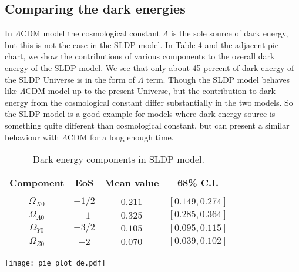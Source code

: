 \documentclass[11pt,a4paper]{article}
\begin{document}
\pagebreak
$\;$
\pagebreak
\subsection{Comparing the dark energies}
In $\Lambda$CDM model the cosmological constant $\Lambda$ is the sole source of dark energy, but this is not the case in the SLDP model. In Table 4 and the adjacent pie chart, we show the contributions of various components to the overall dark energy of the SLDP model. We see that only about 45 percent of dark energy of the SLDP Universe is in the form of $\Lambda$ term. Though the SLDP model behaves like $\Lambda$CDM model up to the present Universe, but the contribution to dark energy from the cosmological constant  differ substantially in the two models. So the SLDP model is a good example for models where dark energy source is something quite different than cosmological constant, but can present a similar behaviour with $\Lambda$CDM for a long enough time.

\begin{table}[h]
\caption{\footnotesize{Dark energy components in SLDP model.}} 
\centering
\parbox{0.4\textwidth}{
\begin{footnotesize}
\begin{tabular}{cccc}
\hline\hline Component&EoS &Mean value&68\% C.I.\\ \hline \\
$\Omega_{X0}$&$-1/2$	& $ 0.211$& $[0.149,0.274]$\\[8pt]
$\Omega_{\Lambda 0}$&$-1$&  $0.325$&$[0.285,0. 364]$ \\[8pt]
$\Omega_{Y0}$&$-3/2$&$0.105$ &$[0.095,0.115]$ \\[8pt]
$\Omega_{Z0}$&$-2$&$0.070$ &$[0.039,0.102]$ \\[8pt]
\hline\hline
\end{tabular}
\end{footnotesize}
}
\qquad
\begin{minipage}[c]{0.43\textwidth}%
\centering
\texttt{[image: pie\_plot\_de.pdf]}
\label{fig:figure}
\end{minipage}
\end{table}

\pagebreak
\end{document}
